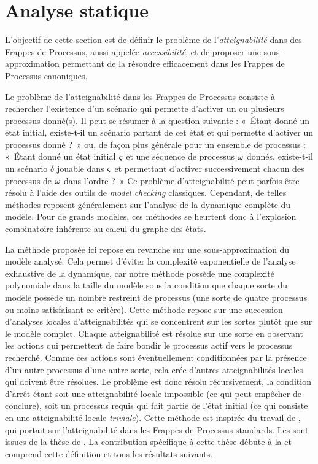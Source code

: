 
\section{Analyse statique}

L'objectif de cette section est de définir le problème de l'\emph{atteignabilité} dans des
Frappes de Processus,
aussi appelée \emph{accessibilité},
et de proposer une sous-approximation permettant de la résoudre efficacement
dans les Frappes de Processus canoniques.

\myskip

Le problème de l'atteignabilité dans les Frappes de Processus consiste à rechercher l'existence
d'un scénario qui permette d'activer un ou plusieurs processus donné(s).
Il peut se résumer à la question suivante :
«~Étant donné un état initial, existe-t-il un scénario partant de cet état et
qui permette d'activer un processus donné ?~»
ou, de façon plus générale pour un ensemble de processus :
«~Étant donné un état initial $\varsigma$ et une séquence de processus $\omega$ donnés,
existe-t-il un scénario $\delta$ jouable dans $\varsigma$ et permettant d'activer successivement
chacun des processus de $\omega$ dans l'ordre ?~»
Ce problème d'atteignabilité peut parfois être résolu à l'aide des outils
de \textit{model checking} classiques.
Cependant, de telles méthodes reposent généralement sur l'analyse de la dynamique complète
du modèle.
Pour de grands modèles, ces méthodes se heurtent donc à l'explosion combinatoire inhérente
au calcul du graphe des états.

La méthode proposée ici repose en revanche sur une sous-approximation du modèle analysé.
Cela permet d'éviter la complexité exponentielle de l'analyse exhaustive de la dynamique,
car notre méthode possède une complexité polynomiale dans la taille du modèle
sous la condition que chaque sorte du modèle possède un nombre restreint de processus
(une sorte de quatre processus ou moins satisfaisant ce critère).
Cette méthode repose sur une succession d'analyses locales d'atteignabilités
qui se concentrent sur les sortes plutôt que sur le modèle complet.
Chaque atteignabilité est résolue sur une sorte en observant les actions qui permettent
de faire bondir le processus actif vers le processus recherché.
Comme ces actions sont éventuellement conditionnées par la présence d'un autre processus
d'une autre sorte, cela crée d'autres atteignabilités locales qui doivent être résolues.
Le problème est donc résolu récursivement, la condition d'arrêt étant soit
une atteignabilité locale impossible (ce qui peut empêcher de conclure),
soit un processus requis qui fait partie de l'état initial (ce qui consiste en une
atteignabilité locale \emph{triviale}).
Cette méthode est inspirée du travail de ,
qui portait sur l'atteignabilité dans les Frappes de Processus standards.
Les  sont issues de la thèse de
.
La contribution spécifique à cette thèse débute à la 
et comprend cette définition et tous les résultats suivants.

